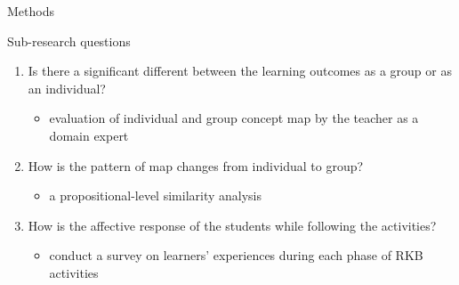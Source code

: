 \begin{frame}{Methods}
    \begin{alertblock}{Sub-research questions}
        \begin{enumerate}
        \item Is there a significant different between the learning outcomes as a group
        or as an individual?
        \begin{itemize}
            \item evaluation of individual and group concept map by the teacher 
                  as a domain expert
        \end{itemize}
        
        \item How is the pattern of map changes from individual to group?
        \begin{itemize}
            \item a propositional-level similarity analysis
        \end{itemize}
        
        \item How is the affective response of the students while following the activities?
        \begin{itemize}
            \item conduct a survey on learners' experiences during each phase of RKB activities
        \end{itemize}
        \end{enumerate}
    \end{alertblock}
\end{frame}

